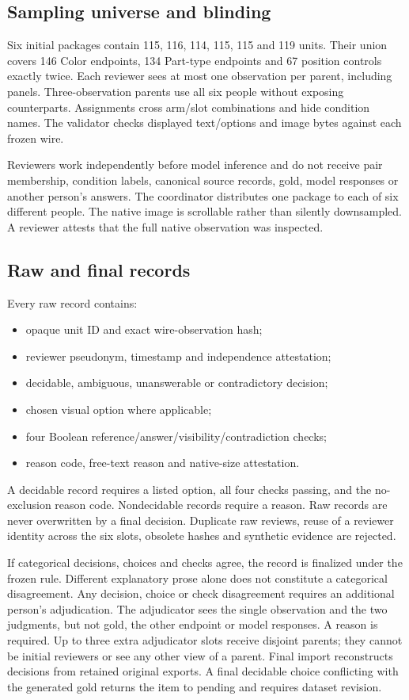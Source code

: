 \documentclass[10pt,twocolumn,letterpaper]{article}
\begin{document}
\subsection{Sampling universe and blinding}
Six initial packages contain 115, 116, 114, 115, 115 and 119 units.
Their union covers 146 Color endpoints, 134 Part-type endpoints and
67 position controls exactly twice. Each reviewer sees at most one
observation per parent, including panels. Three-observation parents
use all six people without exposing counterparts. Assignments cross
arm/slot combinations and hide condition names. The validator checks
displayed text/options and image bytes against each frozen wire.

Reviewers work independently before model inference and do not receive
pair membership, condition labels, canonical source records, gold,
model responses or another person's answers. The coordinator distributes
one package to each of six different people. The native image is
scrollable rather than silently downsampled. A reviewer attests that
the full native observation was inspected.

\subsection{Raw and final records}
Every raw record contains:
\begin{itemize}\setlength\itemsep{1pt}
\item opaque unit ID and exact wire-observation hash;
\item reviewer pseudonym, timestamp and independence attestation;
\item decidable, ambiguous, unanswerable or contradictory decision;
\item chosen visual option where applicable;
\item four Boolean reference/answer/visibility/contradiction checks;
\item reason code, free-text reason and native-size attestation.
\end{itemize}
A decidable record requires a listed option, all four checks passing,
and the no-exclusion reason code. Nondecidable records require a
reason. Raw records are never overwritten by a final decision.
Duplicate raw reviews, reuse of a reviewer identity across the six
slots, obsolete hashes and synthetic evidence are rejected.

If categorical decisions, choices and checks agree, the record is
finalized under the frozen rule. Different explanatory prose alone
does not constitute a categorical disagreement. Any decision, choice
or check disagreement requires an additional person's adjudication.
The adjudicator sees the single observation and the two judgments,
but not gold, the other endpoint or model responses. A reason is
required. Up to three extra adjudicator slots receive disjoint parents;
they cannot be initial reviewers or see any other view of a parent.
Final import reconstructs decisions from retained original exports.
A final decidable choice conflicting with the generated
gold returns the item to pending and requires dataset revision.
\end{document}
